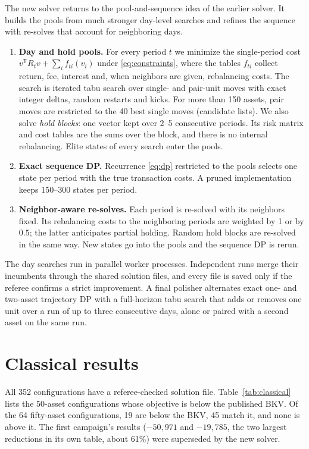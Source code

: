 \documentclass[a4paper]{article}
\begin{document}
The new solver returns to the pool-and-sequence idea of the earlier solver. It builds the pools from much stronger
day-level searches and refines the sequence with re-solves that account for neighboring days.
\begin{enumerate}
\item \textbf{Day and hold pools.} For every period \(t\) we minimize the single-period cost
\(v^\mathsf{T}R_tv+\sum_i f_{ti}(v_i)\) under \eqref{eq:constraints}, where the tables \(f_{ti}\) collect return,
fee, interest and, when neighbors are given, rebalancing costs. The search is iterated tabu search over single- and
pair-unit moves with exact integer deltas, random restarts and kicks. For more than 150 assets, pair moves are restricted to
the 40 best single moves (candidate lists). We also solve \emph{hold blocks}: one vector kept over
2--5 consecutive periods. Its risk matrix and cost tables are the sums over the block, and there is no internal rebalancing.
Elite states of every search enter the pools.
\item \textbf{Exact sequence DP.} Recurrence \eqref{eq:dp} restricted to the pools selects one state per period
with the true transaction costs. A pruned implementation keeps 150--300 states per period.
\item \textbf{Neighbor-aware re-solves.} Each period is re-solved with its neighbors fixed. Its rebalancing costs to the
neighboring periods are weighted by 1 or by \(0.5\); the latter anticipates partial holding. Random hold blocks are re-solved
in the same way. New states go into the pools and the sequence DP is rerun.
\end{enumerate}
The day searches run in parallel worker processes. Independent runs merge their incumbents through the shared
solution files, and every file is saved only if the referee confirms a strict improvement.
A final polisher alternates exact one- and two-asset trajectory DP with a full-horizon tabu search that adds
or removes one unit over a run of up to three consecutive days, alone or paired with a second asset on the same run.

\clearpage
\section{Classical results}

All 352 configurations have a referee-checked solution file. Table~\ref{tab:classical} lists the 50-asset configurations
whose objective is below the published BKV. Of the 64 fifty-asset configurations, 19 are below the BKV, 45 match it, and none is above it.
The first campaign's results (\(-50{,}971\) and \(-19{,}785\), the two largest reductions in its own table, about 61\%)
were superseded by the new solver.
\end{document}
